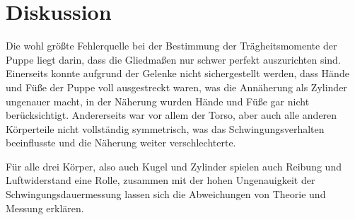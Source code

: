 \section{Diskussion}
\label{sec:Diskussion}

Die wohl größte Fehlerquelle bei der Bestimmung der Trägheitsmomente der Puppe liegt darin, dass die Gliedmaßen nur schwer perfekt auszurichten sind. 
Einerseits konnte aufgrund der Gelenke nicht sichergestellt werden, dass Hände und Füße der Puppe voll ausgestreckt waren, was die Annäherung als Zylinder ungenauer macht, 
in der Näherung wurden Hände und Füße gar nicht berücksichtigt.
Andererseits war vor allem der Torso, aber auch alle anderen Körperteile nicht vollständig symmetrisch, was das Schwingungsverhalten beeinflusste und die Näherung weiter verschlechterte.

Für alle drei Körper, also auch Kugel und Zylinder spielen auch Reibung und Luftwiderstand eine Rolle, zusammen mit der hohen Ungenauigkeit der Schwingungsdauermessung 
lassen sich die Abweichungen von Theorie und Messung erklären.